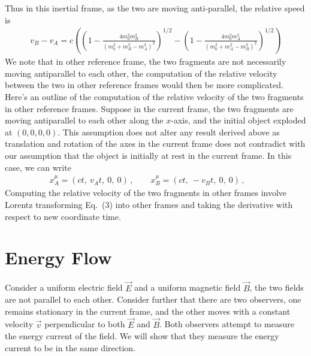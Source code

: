 \documentclass[11pt, onesided]{book}
\theoremstyle{break}
\theoremstyle{break}
\begin{document}
Thus in this inertial frame, as the two are moving anti-parallel, the relative speed is
\begin{align*}
v_B - v_A = c\left(\left( 1 - \frac{4m_0^2 m_B^2}{(m_0^2 + m_B^2 - m_A^2)^{2}}\right)^{1/2}- \left( 1 - \frac{4m_0^2 m_A^2}{(m_0^2 + m_A^2 - m_B^2)^{2}}\right)^{1/2}\right)
\end{align*}
We note that in other reference frame, the two fragments are not necessarily moving antiparallel to each other, the computation of the relative velocity between the two in other reference frames would then be more complicated.\\

Here's an outline of the computation of the relative velocity of the two fragments in other reference frames. Suppose in the current frame, the two fragments are moving antiparallel to each other along the $x$-axis, and the initial object exploded at $(0,0,0,0)$. This assumption does not alter any result derived above as translation and rotation of the axes in the current frame does not contradict with our assumption that the object is initially at rest in the current frame. In this case, we can write
\begin{align}
x_A^\mu = (ct,\
v_A t,\
0,\
0)\,,\qquad
x_B^\mu = (ct,\
-v_B t,\
0,\
0)\,,\qquad
\end{align}
Computing the relative velocity of the two fragments in other frames involve Lorentz transforming Eq.\ (3) into other frames and taking the derivative with respect to new coordinate time.\\

\newpage
\section{Energy Flow}
Consider a uniform electric field $\vec{E}$ and a uniform magnetic field $\vec{B}$, the two fields are not parallel to each other. Consider further that there are two observers, one remains stationary in the current frame, and the other moves with a constant velocity $\vec{v}$ perpendicular to both $\vec{E}$ and $\vec{B}$. Both observers attempt to measure the energy current of the field. We will show that they measure the energy current to be in the same direction. \\
\end{document}
